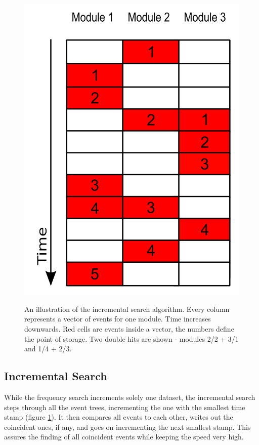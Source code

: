 \begin{figure}
\begin{minipage}{0.49\textwidth}
      	\includegraphics[width = \textwidth]{graphics/search/incrementalSearch.png}
      	\caption[Incremental search Algorithm]{An illustration of the incremental search algorithm. Every column represents a vector of events for one module. Time increases downwards. Red cells are events inside a vector, the numbers define the point of storage. Two double hits are shown - modules 2/2 + 3/1 and 1/4 + 2/3.}
      	\vspace{2.45 cm}
      	\label{fig:incSearch}
      	\end{minipage}
      \end{figure} 
      \subsection{Incremental Search}
      \label{ch:Analysis software:sec:Search algorithms:subsec: Incremental Search}
      While the frequency search increments solely one dataset, the incremental search steps through all the event trees, incrementing the one with the smallest time stamp (figure \ref{fig:incSearch}). It then compares all events to each other, writes out the coincident ones, if any, and goes on incrementing the next smallest stamp. This assures the finding of all coincident events while keeping the speed very high.

